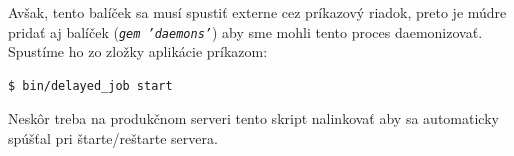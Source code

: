 Avšak, tento balíček sa musí spustiť externe cez príkazový riadok, preto je múdre pridať aj balíček (\emph{\texttt{gem 'daemons'}}) aby sme mohli tento proces daemonizovať. Spustíme ho zo zložky aplikácie príkazom:

\begin{verbatim}
$ bin/delayed_job start
\end{verbatim}

Neskôr treba na produkčnom serveri tento skript nalinkovať aby sa automaticky spúšťal pri štarte/reštarte servera.